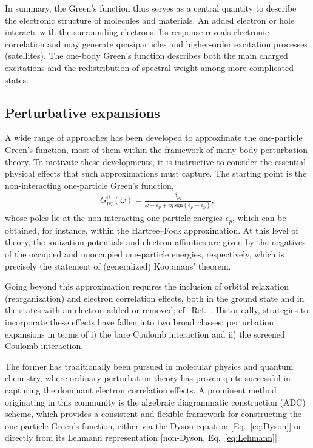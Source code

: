 \documentclass[aip,jcp,reprint,noshowkeys,superscriptaddress]{revtex4-2}
\begin{document}
In summary, the Green's function thus serves as a central quantity to describe the electronic structure of molecules and materials.
An added electron or hole interacts with the surrounding electrons. Its response reveals electronic correlation and may generate quasiparticles and higher-order excitation processes (satellites).
The one-body Green's function describes both the main charged excitations and the redistribution of spectral weight among more complicated states.


\subsection{Perturbative expansions}

A wide range of approaches has been developed to approximate the one-particle Green's function, most of them within the framework of many-body perturbation theory.
To motivate these developments, it is instructive to consider the essential physical effects that such approximations must capture.
The starting point is the non-interacting one-particle Green's function,
\begin{align}
    G^0_{pq}(\omega) = \frac{\delta_{pq}}{\omega - \epsilon_p + i\eta \, \mathrm{sgn}(\epsilon_F - \epsilon_p)},
\end{align}
whose poles lie at the non-interacting one-particle energies $\epsilon_p$, which can be obtained, for instance, within the Hartree--Fock approximation.
At this level of theory, the ionization potentials and electron affinities are given by the negatives of the occupied and unoccupied one-particle energies, respectively, which is precisely the statement of (generalized) Koopmans' theorem.


Going beyond this approximation requires the inclusion of orbital relaxation (reorganization) and electron correlation effects, both in the ground state and in the states with an electron added or removed; cf.\ Ref.~.
Historically, strategies to incorporate these effects have fallen into two broad classes: perturbation expansions in terms of i) the bare Coulomb interaction and ii) the screened Coulomb interaction.

The former has traditionally been pursued in molecular physics and quantum chemistry, where ordinary perturbation theory has proven quite successful in capturing the dominant electron correlation effects.
A prominent method originating in this community is the algebraic diagrammatic construction (ADC) scheme, which provides a consistent and flexible framework for constructing the one-particle Green's function, either via the Dyson equation [Eq.~\eqref{eq:Dyson}] or directly from its Lehmann representation [non-Dyson, Eq.~\eqref{eq:Lehmann}].
\end{document}

